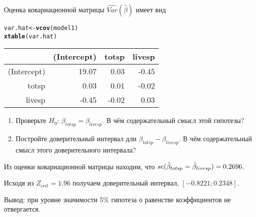 \documentclass[pdftex,11pt,openany]{book}\usepackage[]{graphicx}\usepackage[]{color}
\makeatletter
\newcommand{\hlstd}[1]{\textcolor[rgb]{0.345,0.345,0.345}{#1}}%
\newcommand{\hlkwb}[1]{\textcolor[rgb]{0.69,0.353,0.396}{#1}}%
\newcommand{\hlkwd}[1]{\textcolor[rgb]{0.737,0.353,0.396}{\textbf{#1}}}%
\newenvironment{kframe}{%
 \def\at@end@of@kframe{}%
 \ifinner\ifhmode%
  \def\at@end@of@kframe{\end{minipage}}%
  \begin{minipage}{\columnwidth}%
 \fi\fi%
 \def\FrameCommand##1{\hskip\@totalleftmargin \hskip-\fboxsep
 \colorbox{shadecolor}{##1}\hskip-\fboxsep
     \hskip-\linewidth \hskip-\@totalleftmargin \hskip\columnwidth}%
 \MakeFramed {\advance\hsize-\width
   \@totalleftmargin\z@ \linewidth\hsize
   \@setminipage}}%
 {\par\unskip\endMakeFramed%
 \at@end@of@kframe}
\makeatother
\begin{document}
\begin{problem}
Оценка ковариационной матрицы $\widehat{Var}(\hat{\beta})$ имеет вид
\begin{kframe}
\begin{alltt}
\hlstd{var.hat} \hlkwb{<-} \hlkwd{vcov}\hlstd{(model1)}
\hlkwd{xtable}\hlstd{(var.hat)}
\end{alltt}
\end{kframe}%
\begin{table}[ht]
\centering
\begin{tabular}{rrrr}
  \hline
 & (Intercept) & totsp & livesp \\ 
  \hline
(Intercept) & 19.07 & 0.03 & -0.45 \\ 
  totsp & 0.03 & 0.01 & -0.02 \\ 
  livesp & -0.45 & -0.02 & 0.03 \\ 
   \hline
\end{tabular}
\end{table}



\begin{enumerate}
\item Проверьте $H_0$: $\beta_{totsp}=\beta_{livesp}$. В чём содержательный смысл этой гипотезы?
\item Постройте доверительный интервал дли $\beta_{totsp}-\beta_{livesp}$. В чём содержательный смысл этого доверительного интервала?
\end{enumerate}
\end{problem}


\begin{solution}




Из оценки ковариационной матрицы находим, что $se(\hat{\beta}_{totsp}=\hat{\beta}_{livesp})=0.2696$.

Исходя из $Z_{crit}=1.96$ получаем доверительный интервал, $[-0.8221;0.2348]$.

Вывод: при уровне значимости 5\% гипотеза о равенстве коэффициентов не отвергается.
\end{solution}
\end{document}
